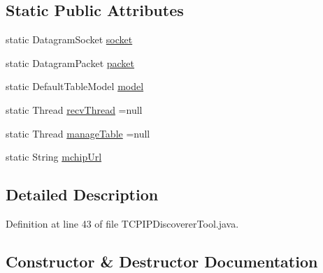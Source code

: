 \subsection*{Static Public Attributes}
\begin{DoxyCompactItemize}
\item 
static Datagram\+Socket \hyperlink{class_t_c_p_i_p___discoverer_1_1_t_c_p_i_p_discoverer_tool_a2e854196cd879b68fc586353de052352}{socket}
\item 
static Datagram\+Packet \hyperlink{class_t_c_p_i_p___discoverer_1_1_t_c_p_i_p_discoverer_tool_a9bf27a75947096ae95505af45f859298}{packet}
\item 
static Default\+Table\+Model \hyperlink{class_t_c_p_i_p___discoverer_1_1_t_c_p_i_p_discoverer_tool_a412a78045198d8e226d1488d9e10c01e}{model}
\item 
static Thread \hyperlink{class_t_c_p_i_p___discoverer_1_1_t_c_p_i_p_discoverer_tool_afb10c25014cb14ac13db7ac61e85f6a3}{recv\+Thread} =null
\item 
static Thread \hyperlink{class_t_c_p_i_p___discoverer_1_1_t_c_p_i_p_discoverer_tool_afd7a98c0d68f0137ffa1681cb3cdd804}{manage\+Table} =null
\item 
static String \hyperlink{class_t_c_p_i_p___discoverer_1_1_t_c_p_i_p_discoverer_tool_a51f2041f18e3e354b2eca28865776649}{mchip\+Url}
\end{DoxyCompactItemize}


\subsection{Detailed Description}


Definition at line 43 of file T\+C\+P\+I\+P\+Discoverer\+Tool.\+java.



\subsection{Constructor \& Destructor Documentation}
\hypertarget{class_t_c_p_i_p___discoverer_1_1_t_c_p_i_p_discoverer_tool_a88b9d45f9313b52a1f1008cd9b0d79a8}{}
